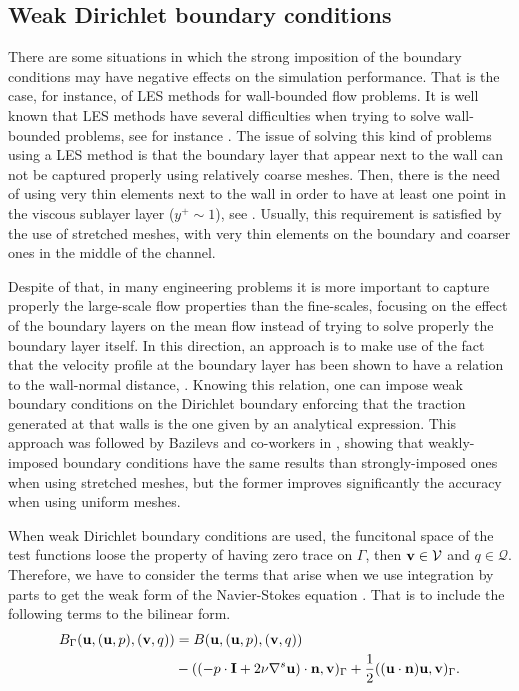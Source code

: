 \subsection{Weak Dirichlet boundary conditions}
\label{subsec-C7_weak_bcs}
There are some situations in which the strong imposition of the boundary conditions may have negative effects on the simulation performance. That is the case, for instance, of LES methods for wall-bounded flow problems. It is well known that LES methods have several difficulties when trying to solve wall-bounded problems, see for instance \cite{spalart_strategies_2000,spalart1997comments}. The issue of solving this kind of problems using a LES method is that the boundary layer that appear next to the wall can not be captured properly using relatively coarse meshes. Then, there is the need of using very thin elements next to the wall in order to have at least one point in the viscous sublayer layer ($ y^+\sim1 $), see \cite{pope_turbulent_2000}. Usually, this requirement is satisfied by the use of stretched meshes, with very thin elements on the boundary and coarser ones in the middle of the channel.

Despite of that, in many engineering problems it is more important to capture properly the large-scale flow properties than the fine-scales, focusing on the effect of the boundary layers on the mean flow instead of trying to solve properly the boundary layer itself. In this direction, an approach is to make use of the fact that the velocity profile at the boundary layer has been shown to have a relation to the wall-normal distance, \cite{pope_turbulent_2000}. Knowing this relation, one can impose weak boundary conditions on the Dirichlet boundary enforcing that the traction generated at that walls is the one given by an analytical expression. This approach was followed by Bazilevs and co-workers in \cite{bazilevs_weak_2007}, showing that weakly-imposed boundary conditions have the same results than strongly-imposed ones when using stretched meshes, but the former improves significantly the accuracy when using uniform meshes. 

When weak Dirichlet boundary conditions are used, the funcitonal space of the test functions loose the property of having zero trace on $\Gamma$, then ${\bf v}\in\mathcal{V}$ and $q\in\mathcal{Q}$. Therefore, we have to consider the terms that arise when we use integration by parts to get the weak form of the Navier-Stokes equation . That is to include the following terms to the bilinear form.
\begin{align}
\label{eq-C7_bilinear_boundary}
B_\Gamma({\bf u},({\bf u},p),({\bf v},q))&=B({\bf u},({\bf u},p),({\bf v},q))\\\nonumber
&-((-p\cdot\mathbf{I}+2\nu\nabla^s{\bf u})\cdot{\bf n},{\bf v})_\Gamma+\frac{1}{2}(({\bf u}\cdot{\bf n}){\bf u},{\bf v})_\Gamma.
\end{align}

